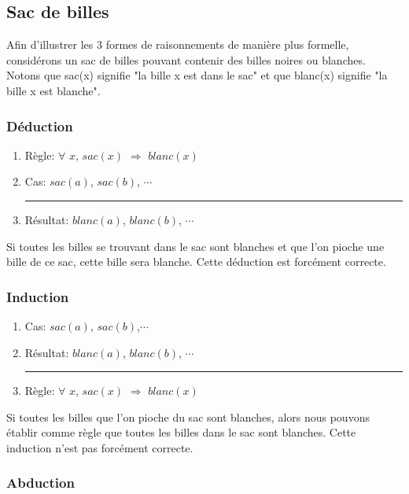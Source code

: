 \subsection{Sac de billes}

Afin d'illustrer les 3 formes de raisonnements de manière plus formelle, considérons un sac de billes pouvant contenir des billes noires ou blanches. Notons que sac(x) signifie "la bille x est dans le sac" et que blanc(x) signifie "la bille x est blanche". \\

\subsubsection{Déduction}

\begin{enumerate}
  \item Règle: $\forall$ $x$, $sac(x)$ $\Rightarrow$ $blanc(x)$
  \item Cas: $sac(a)$, $sac(b)$, $\cdots$\\
  \rule{5.5cm}{.1pt} 
  \item Résultat: $blanc(a)$, $blanc(b)$, $\cdots$
\end{enumerate}

Si toutes les billes se trouvant dans le sac sont blanches et que l'on pioche une bille de ce sac, cette bille sera blanche. Cette déduction est forcément correcte.

\subsubsection{Induction}

\begin{enumerate}
  \item Cas: $sac(a)$, $sac(b)$,$\cdots$
  \item Résultat: $blanc(a)$, $blanc(b)$, $\cdots$\\
  \rule{5.5cm}{.1pt}	
  \item Règle: $\forall$ $x$, $sac(x)$ $\Rightarrow$ $blanc(x)$
\end{enumerate}

Si toutes les billes que l'on pioche du sac sont blanches, alors nous pouvons établir comme règle que toutes les billes dans le sac sont blanches. Cette induction n'est pas forcément correcte.

\subsubsection{Abduction}

